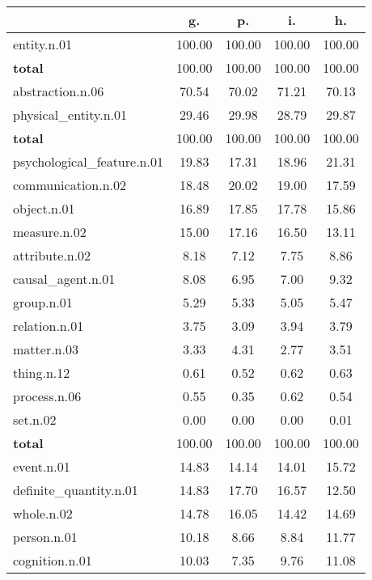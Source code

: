 \begin{table}[h!]
\begin{center}
\begin{tabular}{| l || c | c | c | c |}\hline
 & {\bf g.} & {\bf p.} & {\bf i.} & {\bf h.} \\\hline\hline
entity.n.01 & 100.00  & 100.00  & 100.00  & 100.00 \\\hline\hline
{{\bf total}} & 100.00  & 100.00  & 100.00  & 100.00 \\\hline\hline\hline
abstraction.n.06 & 70.54  & 70.02  & 71.21  & 70.13 \\\hline
physical\_entity.n.01 & 29.46  & 29.98  & 28.79  & 29.87 \\\hline\hline
{{\bf total}} & 100.00  & 100.00  & 100.00  & 100.00 \\\hline\hline\hline
psychological\_feature.n.01 & 19.83  & 17.31  & 18.96  & 21.31 \\\hline
communication.n.02 & 18.48  & 20.02  & 19.00  & 17.59 \\\hline
object.n.01 & 16.89  & 17.85  & 17.78  & 15.86 \\\hline
measure.n.02 & 15.00  & 17.16  & 16.50  & 13.11 \\\hline
attribute.n.02 & 8.18  & 7.12  & 7.75  & 8.86 \\\hline
causal\_agent.n.01 & 8.08  & 6.95  & 7.00  & 9.32 \\\hline
group.n.01 & 5.29  & 5.33  & 5.05  & 5.47 \\\hline
relation.n.01 & 3.75  & 3.09  & 3.94  & 3.79 \\\hline
matter.n.03 & 3.33  & 4.31  & 2.77  & 3.51 \\\hline
thing.n.12 & 0.61  & 0.52  & 0.62  & 0.63 \\\hline
process.n.06 & 0.55  & 0.35  & 0.62  & 0.54 \\\hline
set.n.02 & 0.00  & 0.00  & 0.00  & 0.01 \\\hline\hline
{{\bf total}} & 100.00  & 100.00  & 100.00  & 100.00 \\\hline\hline\hline
event.n.01 & 14.83  & 14.14  & 14.01  & 15.72 \\\hline
definite\_quantity.n.01 & 14.83  & 17.70  & 16.57  & 12.50 \\\hline
whole.n.02 & 14.78  & 16.05  & 14.42  & 14.69 \\\hline
person.n.01 & 10.18  & 8.66  & 8.84  & 11.77 \\\hline
cognition.n.01 & 10.03  & 7.35  & 9.76  & 11.08 \\\hline

\end{tabular}
\end{center}
\end{table}
